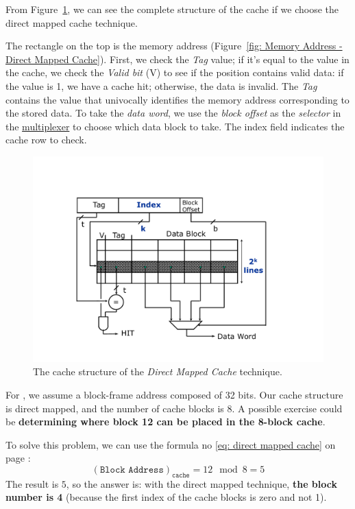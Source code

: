 \noindent
From Figure~\ref{fig: Direct Mapped Cache - Structure}, we can see the complete structure of the cache if we choose the direct mapped cache technique. 

\highspace
The rectangle on the top is the memory address (Figure~\ref{fig: Memory Address - Direct Mapped Cache}). First, we check the \emph{Tag} value; if it's equal to the value in the cache, we check the \emph{Valid bit} (V) to see if the position contains valid data: if the value is 1, we have a cache hit; otherwise, the data is invalid. The \emph{Tag} contains the value that univocally identifies the memory address corresponding to the stored data. To take the \emph{data word}, we use the \emph{block offset} as the \emph{selector} in the \href{https://en.wikipedia.org/wiki/Multiplexer}{multiplexer} to choose which data block to take. The index field indicates the cache row to check.

\newpage

\begin{figure}[!htp]
    \centering
    \includegraphics[width=.7\textwidth]{img/direct-mapped-cache-2.pdf}
    \caption{The cache structure of the \emph{Direct Mapped Cache} technique.}
    \label{fig: Direct Mapped Cache - Structure}
\end{figure}

\noindent
For , we assume a block-frame address composed of 32 bits. Our cache structure is direct mapped, and the number of cache blocks is 8. A possible exercise could be \textbf{determining where block 12 can be placed in the 8-block cache}.

\highspace
To solve this problem, we can use the formula no \ref{eq: direct mapped cache} on page \pageref{eq: direct mapped cache}: 
\begin{equation*}
    \left(\texttt{Block Address}\right)_{\texttt{cache}} = 12 \mod 8 = 5
\end{equation*}
The result is $5$, so the answer is: with the direct mapped technique, \textbf{the block number is 4} (because the first index of the cache blocks is zero and not 1).

